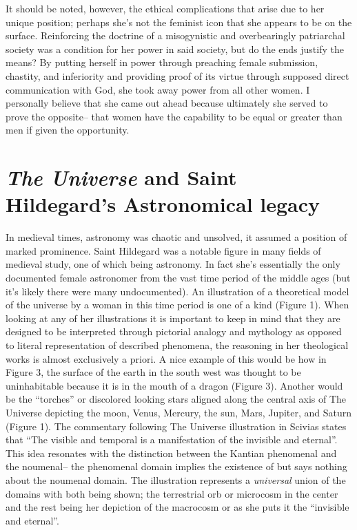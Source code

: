 \documentclass{turabian-researchpaper}
\begin{document}
    \linebreak[4]
    It should be noted, however, the ethical complications that arise due to her unique position; perhaps she's not the feminist icon that she appears to be on the surface. Reinforcing the doctrine of a misogynistic and overbearingly patriarchal society was a condition for her power in said society, but do the ends justify the means? By putting herself in power through preaching female submission, chastity, and inferiority and providing proof of its virtue through supposed direct communication with God, she took away power from all other women. I personally believe that she came out ahead because ultimately she served to prove the opposite-- that women have the capability to be equal or greater than men if given the opportunity.


\section{\emph{The Universe} and Saint Hildegard's Astronomical legacy}

    In medieval times, astronomy was chaotic and unsolved, it assumed a position of marked prominence. Saint Hildegard was a notable figure in many fields of medieval study, one of which being astronomy. In fact she's essentially the only documented female astronomer from the vast time period of the middle ages (but it's likely there were many undocumented). An illustration of a theoretical model of the universe by a woman in this time period is one of a kind (Figure 1). When looking at any of her illustrations it is important to keep in mind that they are designed to be interpreted through pictorial analogy and mythology as opposed to literal representation of described phenomena, the reasoning in her theological works is almost exclusively a priori. A nice example of this would be how in Figure 3, the surface of the earth in the south west was thought to be uninhabitable because it is in the mouth of a dragon (Figure 3).\autocite{singer} Another would be the ``torches'' or discolored looking stars aligned along the central axis of The Universe depicting the moon, Venus, Mercury, the sun, Mars, Jupiter, and Saturn (Figure 1). The commentary following The Universe illustration in Scivias states that ``The visible and temporal is a manifestation of the invisible and eternal''. This idea resonates with the distinction between the Kantian phenomenal and the noumenal-- the phenomenal domain implies the existence of but says nothing about the noumenal domain.\autocite[94]{scivias} The illustration represents a \emph{universal} union of the domains with both being shown; the terrestrial orb or microcosm in the center and the rest being her depiction of the macrocosm or as she puts it the ``invisible and eternal''.
\end{document}
